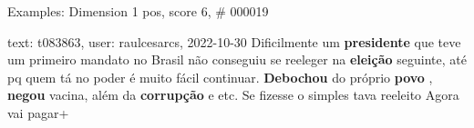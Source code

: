 \begin{frame}{Examples: Dimension 1 pos, score 6, \# 000019}
\footnotesize
\begin{exampleblock}{text: t083863, user: raulcesarcs, 2022-10-30}
Dificilmente um \textbf{presidente} que teve um primeiro mandato no Brasil não 
conseguiu se reeleger na \textbf{eleição} seguinte, até pq quem tá no poder é 
muito fácil continuar. \textbf{Debochou} do próprio \textbf{povo} , 
\textbf{negou} vacina, além da \textbf{corrupção} e etc. Se fizesse o simples 
tava reeleito Agora vai pagar+ 
\end{exampleblock}
\end{frame}
